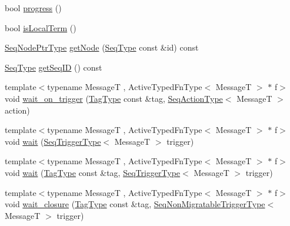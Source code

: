 \begin{DoxyCompactItemize}
\item 
bool \hyperlink{structvt_1_1seq_1_1_tagged_sequencer_a3b072946116668dabe7ade299296bc08}{progress} ()
\item 
bool \hyperlink{structvt_1_1seq_1_1_tagged_sequencer_a73854cf66eef3d55c5ecaa9fc21ec8a2}{is\+Local\+Term} ()
\item 
\hyperlink{namespacevt_1_1seq_ae6a4874b585be0612aaca32ca6d2d191}{Seq\+Node\+Ptr\+Type} \hyperlink{structvt_1_1seq_1_1_tagged_sequencer_a2a36e25799dc4c98b93002536f003c01}{get\+Node} (\hyperlink{structvt_1_1seq_1_1_tagged_sequencer_a1c8ee839258d0f88c49ef660267a81d5}{Seq\+Type} const \&id) const
\item 
\hyperlink{structvt_1_1seq_1_1_tagged_sequencer_a1c8ee839258d0f88c49ef660267a81d5}{Seq\+Type} \hyperlink{structvt_1_1seq_1_1_tagged_sequencer_a47eb9c68e4f21a4eb53dce74ca2f9d49}{get\+Seq\+ID} () const
\item 
{\footnotesize template$<$typename MessageT , Active\+Typed\+Fn\+Type$<$ Message\+T $>$ $\ast$ f$>$ }\\void \hyperlink{structvt_1_1seq_1_1_tagged_sequencer_a7d2d5815ae147f286006419aa3180020}{wait\+\_\+on\+\_\+trigger} (\hyperlink{namespacevt_a84ab281dae04a52a4b243d6bf62d0e52}{Tag\+Type} const \&tag, \hyperlink{structvt_1_1seq_1_1_tagged_sequencer_a0210dbd34288d440e0cd51db9d6637bd}{Seq\+Action\+Type}$<$ MessageT $>$ action)
\item 
{\footnotesize template$<$typename MessageT , Active\+Typed\+Fn\+Type$<$ Message\+T $>$ $\ast$ f$>$ }\\void \hyperlink{structvt_1_1seq_1_1_tagged_sequencer_a9a1be66a0b4667009824bbfbf9a5f7d1}{wait} (\hyperlink{structvt_1_1seq_1_1_tagged_sequencer_a4b015f2f7d3197a66af5576f0e63a834}{Seq\+Trigger\+Type}$<$ MessageT $>$ trigger)
\item 
{\footnotesize template$<$typename MessageT , Active\+Typed\+Fn\+Type$<$ Message\+T $>$ $\ast$ f$>$ }\\void \hyperlink{structvt_1_1seq_1_1_tagged_sequencer_a8c96cc7cc925cfd95b0e90d5e29b2211}{wait} (\hyperlink{namespacevt_a84ab281dae04a52a4b243d6bf62d0e52}{Tag\+Type} const \&tag, \hyperlink{structvt_1_1seq_1_1_tagged_sequencer_a4b015f2f7d3197a66af5576f0e63a834}{Seq\+Trigger\+Type}$<$ MessageT $>$ trigger)
\item 
{\footnotesize template$<$typename MessageT , Active\+Typed\+Fn\+Type$<$ Message\+T $>$ $\ast$ f$>$ }\\void \hyperlink{structvt_1_1seq_1_1_tagged_sequencer_a54b83e9239a17a4fd75f8c2c9ac59cee}{wait\+\_\+closure} (\hyperlink{namespacevt_a84ab281dae04a52a4b243d6bf62d0e52}{Tag\+Type} const \&tag, \hyperlink{namespacevt_1_1seq_aa88b0d93284d188be39704024ab58b8f}{Seq\+Non\+Migratable\+Trigger\+Type}$<$ MessageT $>$ trigger)

\end{DoxyCompactItemize}
